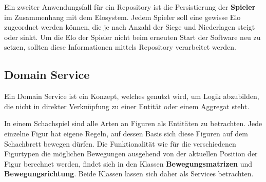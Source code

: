 Ein zweiter Anwendungsfall für ein Repository ist die Persistierung der \textbf{Spieler} im Zusammenhang mit dem Elosystem. 
Jedem Spieler soll eine gewisse Elo zugeordnet werden können, die je nach Anzahl der Siege und Niederlagen steigt oder sinkt. 
Um die Elo der Spieler nicht beim erneuten Start der Software neu zu setzen, sollten diese Informationen mittels Repository verarbeitet werden. 

\subsection*{Domain Service}

Ein Domain Service ist ein Konzept, welches genutzt wird, um Logik abzubilden, die nicht in direkter Verknüpfung zu einer Entität oder einem Aggregat steht. 

In einem Schachspiel sind alle Arten an Figuren als Entitäten zu betrachten. 
Jede einzelne Figur hat eigene Regeln, auf dessen Basis sich diese Figuren auf dem Schachbrett bewegen dürfen. 
Die Funktionalität wie für die verschiedenen Figurtypen die möglichen Bewegungen ausgehend von der aktuellen Position der Figur berechnet werden, findet sich in den Klassen \textbf{Bewegungsmatrizen} und \textbf{Bewegungsrichtung}.
Beide Klassen lassen sich daher als Services betrachten.